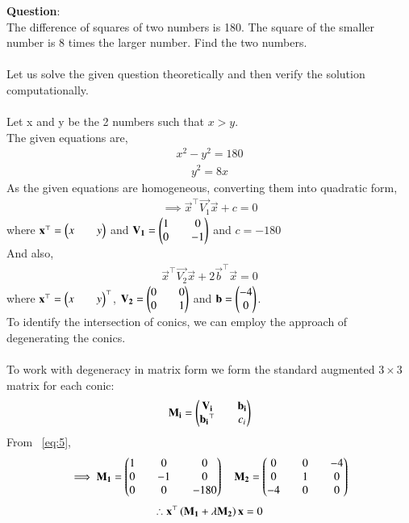 \documentclass[journal]{IEEEtran}
\begin{document}
\textbf{Question}:\\
The difference of squares of two numbers is 180. The square of the smaller number is 8 times the larger number. Find the two numbers.\\
\solution \\
Let us solve the given question theoretically and then verify the solution computationally.\\
\\
Let x and y be the 2 numbers such that $x>y$.\\
The given equations are,
\begin{align}
    x^2-y^2=180 \label{eq:1}
\end{align}
\begin{align}
    y^2=8x \label{eq:2}
\end{align}
As the given equations are homogeneous, converting them into quadratic form,
\begin{align}
    \implies \vec{x}^{\top}\vec{V_1}\vec{x}+c=0 \label{eq:3}
\end{align}
where $\mathbf{x}^{\top}=\begin{pmatrix}x&&y\end{pmatrix}$ and $\mathbf{V_1}=\begin{pmatrix}1&&0\\0&&-1\end{pmatrix}$ and $c=-180$\\
And also,
\begin{align}
    \vec{x}^{\top}\vec{V_2}\vec{x}+2\vec{b}^{\top}\vec{x}=0 \label{eq:4}
\end{align}
where $\mathbf{x}^{\top}=\begin{pmatrix}x&&y\end{pmatrix}^{\top}$, $\mathbf{V_2}=\begin{pmatrix}0&&0\\0&&1\end{pmatrix}$ and $\mathbf{b}=\begin{pmatrix}-4\\0\end{pmatrix}$.\\
To identify the intersection of conics, we can employ the approach of degenerating the conics.\\
\\
To work with degeneracy in matrix form we form the standard augmented $3 \times 3$ matrix for each conic:
\begin{align}
    \mathbf{M_i}=\begin{pmatrix}\mathbf{V_i}&&\mathbf{b_i}\\\mathbf{b_i}^{\top}&&c_i\end{pmatrix} \label{eq:5}
\end{align}
From ~\eqref{eq:5},
\begin{align}
    \implies \mathbf{M_1}=\begin{pmatrix}1&&0&&0\\0&&-1&&0\\0&&0&&-180\end{pmatrix} \quad 
    \mathbf{M_2}=\begin{pmatrix}0&&0&&-4\\0&&1&&0\\-4&&0&&0\end{pmatrix}
\end{align}
\begin{align}
    \therefore \mathbf{x}^{\top}\left(\mathbf{M_1+\lambda M_2}\right)\mathbf{x}=0
\end{align}
\end{document}
